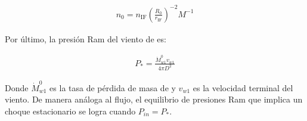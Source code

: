 \begin{align}
  n_0 = n_{\mathrm{IF}}\left(\frac{R_0}{r_{\mathrm{IF}}}\right)^{-2} M^{-1} \label{eq:density-scale}
\end{align}


Por último, la presión Ram del viento de \thC{} es:

\begin{align}
  P_* = \frac{\dot{M}^{0}_{w1}v_{w1}}{4\pi D^2} \label{eq:P-star}
\end{align}

 Donde $\dot{M}^{0}_{w1}$ es la tasa de pérdida de masa de \thC{} y $v_{w1}$ es la velocidad terminal del viento. De manera análoga al flujo, el equilibrio de presiones Ram que implica un choque estacionario se logra cuando $P_{in} = P_*$. %



